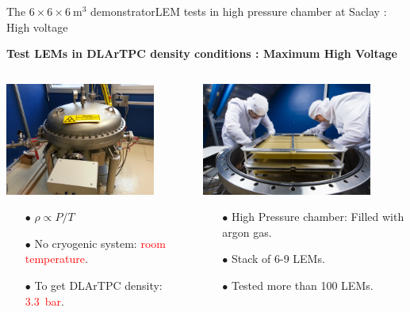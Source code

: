 \documentclass[10pt]{beamer}
\begin{document}
    \begin{frame}{The \texorpdfstring{$6 \times 6 \times \SI{6}{\meter\cubed}$}{666} demonstrator}{LEM tests in high pressure chamber at Saclay : High voltage}
    	\begin{scriptsize}
    		\begin{center}\textbf{Test LEMs in DLArTPC density conditions : Maximum High Voltage}\end{center}
    		\begin{columns}
		    	\begin{column}{0.5\textwidth}
		    		\includegraphics[height=3.7cm]{figures/666/gamelle.jpg}\\
		    		\begin{itemize}
		    			\item[$\bullet$] $\rho \propto P/T$
		    			\item[$\bullet$] No cryogenic system: \textcolor{red}{room temperature}.
		    			\item[$\bullet$] To get DLArTPC density: \textcolor{red}{\SI{3.3}{\bar}}.
		    		\end{itemize}
		    	\end{column}\hfill
		    	\begin{column}{0.5\textwidth}
		    		\includegraphics[height=3.7cm]{figures/666/6lems_gamelle.jpg}\\
		    		\begin{itemize}
		    			\item[$\bullet$] High Pressure chamber: Filled with argon gas.
		    			\item[$\bullet$] Stack of 6-9 LEMs.
		    			\item[$\bullet$] Tested more than 100 LEMs.
		    		\end{itemize}
		    	\end{column}
		    \end{columns}
	    \end{scriptsize} 
    \end{frame}
    
\end{document}
